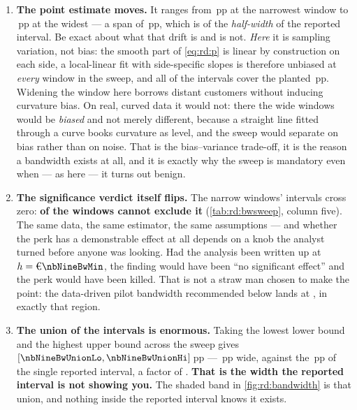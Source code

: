 \begin{enumerate}[leftmargin=*, itemsep=.4em]
  \item \textbf{The point estimate moves.} It ranges from \nbNineBwEstLo{}\,pp at the narrowest
        window to \nbNineBwEstHi{}\,pp at the widest --- a span of \nbNineBwEstRange{}\,pp, which is
        \pc{\nbNineBwRangeOverHalf} of the \emph{half-width} of the reported interval. Be exact
        about what that drift is and is not. \emph{Here} it is sampling variation, not bias: the
        smooth part of \cref{eq:rd:p} is linear by construction on each side, a local-linear fit
        with side-specific slopes is therefore unbiased at \emph{every} window in the sweep, and
        all \nbNineBwNCovers{} of the \nbNineBwNWindows{} intervals cover the planted
        \nbNineTrueJump{}\,pp. Widening the window here borrows distant customers without inducing
        curvature bias. On real, curved data it would not: there the wide windows would be
        \emph{biased} and not merely different, because a straight line fitted through a curve
        books curvature as level, and the sweep would separate on bias rather than on noise. That
        is the bias--variance trade-off, it is the reason a bandwidth exists at all, and it is
        exactly why the sweep is mandatory even when --- as here --- it turns out benign.
  \item \textbf{The significance verdict itself flips.} The narrow windows' intervals cross zero:
        \textbf{\nbNineBwNInsignif{} of the \nbNineBwNWindows{} windows cannot exclude it}
        (\cref{tab:rd:bwsweep}, column five). The same data, the same estimator, the
        same assumptions --- and whether the perk has a demonstrable effect at all depends on a knob
        the analyst turned before anyone was looking. Had the analysis been written up at
        $h = \eur{\nbNineBwMin}$, the finding would have been ``no significant effect'' and the perk
        would have been killed. That is not a straw man chosen to make the point: the data-driven
        pilot bandwidth recommended below lands at \eur{\nbNineHRot}, in exactly that region.
  \item \textbf{The union of the intervals is enormous.} Taking the lowest lower bound and the
        highest upper bound across the sweep gives $[\nbNineBwUnionLo, \nbNineBwUnionHi]$\,pp ---
        \nbNineBwUnionWidth{}\,pp wide, against the \nbNineRdWidth{}\,pp of the single reported
        interval, a factor of \nbNineBwUnionOverWidth. \textbf{That is the width the reported
        interval is not showing you.} The shaded band in \cref{fig:rd:bandwidth} is that union, and
        nothing inside the reported interval knows it exists.
\end{enumerate}

